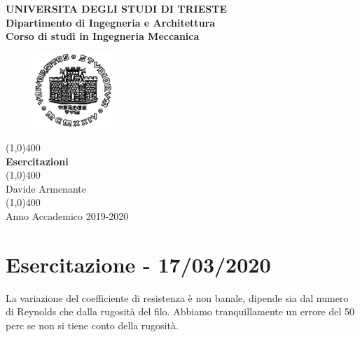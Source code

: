 \documentclass[fleqn]{article}
\begin{document}
\begin{titlepage}
	\begin{center}
		\vspace{1cm}
		\large{\textbf{UNIVERSITA DEGLI STUDI DI TRIESTE}}\\[3mm]
		\large{\textbf{Dipartimento di Ingegneria e Architettura}}\\[.7mm]
		\large{\textbf{Corso di studi in Ingegneria Meccanica}}\\
		\begin{figure}
			\centering
			  \includegraphics[width=3cm]{fig/unilogo.pdf}
		\end{figure}
		\vfill
		\line(1,0){400}\\
		\huge{\textbf{Esercitazioni}}\\
		\line(1,0){400}\\
		\vfill
		\hfill \normalsize Davide Armenante\\
		\line(1,0){400}\\
		Anno Accademico 2019-2020
		
	\end{center}
\end{titlepage}

\pagebreak
\tableofcontents 
\thispagestyle{empty}
\pagebreak
\setcounter{page}{1}

\section{Esercitazione - 17/03/2020}
La variazione del coefficiente di resistenza è non banale, dipende sia dal numero di Reynolds che dalla rugosità del filo. Abbiamo tranquillamente un errore del 50 perc se non si tiene conto della rugosità.
\end{document}
